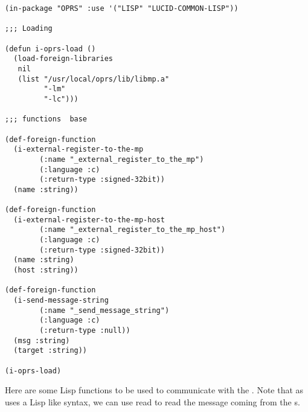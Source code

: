\begin{verbatim}
(in-package "OPRS" :use '("LISP" "LUCID-COMMON-LISP"))

;;; Loading

(defun i-oprs-load ()
  (load-foreign-libraries
   nil
   (list "/usr/local/oprs/lib/libmp.a"
         "-lm"
         "-lc")))

;;; functions  base

(def-foreign-function
  (i-external-register-to-the-mp
        (:name "_external_register_to_the_mp")
        (:language :c)
        (:return-type :signed-32bit))
  (name :string))

(def-foreign-function
  (i-external-register-to-the-mp-host
        (:name "_external_register_to_the_mp_host")
        (:language :c)
        (:return-type :signed-32bit))
  (name :string)
  (host :string))

(def-foreign-function
  (i-send-message-string
        (:name "_send_message_string")
        (:language :c)
        (:return-type :null))
  (msg :string)
  (target :string))

(i-oprs-load)
\end{verbatim}

Here are some Lisp functions to be used to communicate with the
\MPA{}. Note that as \COPRS{} uses a Lisp like syntax, we can use read to
read the message coming from the \CPK s.

